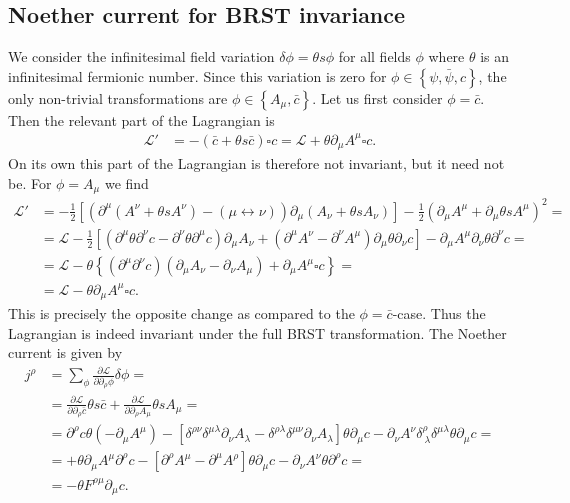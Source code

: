 \documentclass[english, parskip=full]{scrartcl}
\newcommand{\kla}{}
\newcommand{\klam}{}
\newcommand{\klammer}{}
\begin{document}
\subsection{Noether current for BRST invariance}
We consider the infinitesimal field variation $\delta\phi = \theta s\phi$ for all fields $\phi$ where $\theta$ is an infinitesimal fermionic number.
Since this variation is zero for $\phi \in \klammer\left\{ \psi, \bar{\psi}, c \right\}$, the only non-trivial transformations are $\phi \in \klammer\left\{ A_\mu, \bar{c} \right\}$.
Let us first consider $\phi = \bar{c}$.
Then the relevant part of the Lagrangian is
\begin{align}
\mathcal{L}' &= - \kla\left( \bar{c} + \theta s\bar{c} \right) \square c = \mathcal{L} + \theta \partial_\mu A^\mu \square c.
\end{align}
On its own this part of the Lagrangian is therefore not invariant, but it need not be.
For $\phi = A_\mu$ we find
\begin{align}
\mathcal{L}' &= -\frac{1}{2} \klam\left[  \kla\left( \partial^\mu \kla\left( A^\nu + \theta sA^\nu \right) - (\mu\leftrightarrow\nu) \right) \partial_\mu \kla\left( A_\nu + \theta s A_\nu \right) \right] - \frac{1}{2} \kla\left( \partial_\mu A^\mu + \partial_\mu \theta sA^\mu  \right)^2 = \\
&= \mathcal{L} - \frac{1}{2} \klam\left[ \kla\left( \partial^\mu \theta \partial^\nu c - \partial^\nu \theta \partial^\mu c  \right) \partial_\mu A_\nu + \kla\left( \partial^\mu A^\nu - \partial^\nu A^\mu  \right) \partial_\mu \theta \partial_\nu c \right] - \partial_\mu A^\mu \partial_\nu \theta \partial^\nu c = \\
&= \mathcal{L} - \theta \klammer\left\{ \kla\left( \partial^\mu \partial^\nu c \right) \left(\partial_\mu A_\nu - \partial_\nu A_\mu \right) + \partial_\mu A^\mu \square c \right\} = \\
&= \mathcal{L} - \theta \partial_\mu A^\mu \square c.
\end{align}
This is precisely the opposite change as compared to the $\phi = \bar{c}$-case.
Thus the Lagrangian is indeed invariant under the full BRST transformation.
The Noether current is given by
\begin{align}
j^\rho &= \sum_\phi \frac{\partial \mathcal{L}}{\partial \partial_\rho \phi} \delta \phi = \\
&= \frac{\partial \mathcal{L}}{\partial \partial_\rho \bar{c}} \theta s\bar{c} + \frac{\partial \mathcal{L}}{\partial \partial_\rho A_\mu} \theta sA_\mu = \\
&= \partial^\rho c \theta \kla\left( -\partial_\mu A^\mu  \right) - \klam\left[ \delta^{\rho \nu} \delta^{\mu \lambda} \partial_\nu A_\lambda - \delta^{\rho \lambda} \delta^{\mu \nu} \partial_\nu A_\lambda \right] \theta \partial_\mu c - \partial_\nu A^\nu \delta^{\rho}_{\ \lambda} \delta^{\mu \lambda} \theta \partial_\mu c = \\
&= +\theta \partial_\mu A^\mu \partial^\rho c - \klam\left[ \partial^\rho A^\mu - \partial^\mu A^\rho  \right] \theta \partial_\mu c - \partial_\nu A^\nu \theta \partial^\rho c  = \\
&= -\theta F^{\rho \mu} \partial_\mu c.
\end{align}
\end{document}
